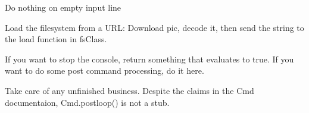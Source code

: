 \documentclass[letterpaper,12pt,openany,oneside]{sphinxmanual}
\begin{document}
\begin{fulllineitems}
\begin{fulllineitems}
\label{main:main.Console.emptyline}
Do nothing on empty input line

\end{fulllineitems}


\begin{fulllineitems}
\label{main:main.Console.init_factory}
\end{fulllineitems}


\begin{fulllineitems}
\label{main:main.Console.loadfs}
Load the filesystem from a URL: Download pic, decode it, then send the string to the load function in fsClass.

\end{fulllineitems}


\begin{fulllineitems}
\label{main:main.Console.open_window}
\end{fulllineitems}


\begin{fulllineitems}
\label{main:main.Console.postcmd}
If you want to stop the console, return something that evaluates to true.
If you want to do some post command processing, do it here.

\end{fulllineitems}


\begin{fulllineitems}
\label{main:main.Console.postloop}
Take care of any unfinished business.
Despite the claims in the Cmd documentaion,
Cmd.postloop() is not a stub.

\end{fulllineitems}



\end{fulllineitems}
\end{document}
